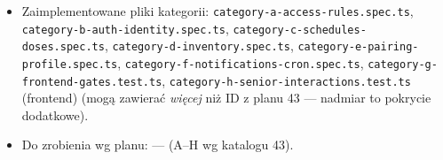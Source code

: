 \documentclass[11pt,a4paper]{article}
\begin{document}
\begin{itemize}[leftmargin=*]
  \item Zaimplementowane pliki kategorii: \texttt{category-a-access-rules.spec.ts},
        \texttt{category-b-auth-identity.spec.ts}, \texttt{category-c-schedules-doses.spec.ts},
        \texttt{category-d-inventory.spec.ts}, \texttt{category-e-pairing-profile.spec.ts},
        \texttt{category-f-notifications-cron.spec.ts},
        \texttt{category-g-frontend-gates.test.ts},
        \texttt{category-h-senior-interactions.test.ts} (frontend)
        (mogą zawierać \emph{więcej} niż ID z planu 43 --- nadmiar to pokrycie dodatkowe).
  \item Do zrobienia wg planu: --- (A--H wg katalogu 43).
\end{itemize}
\end{document}
